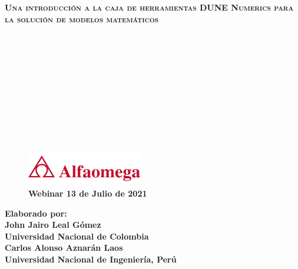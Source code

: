 {
\begin{frame}

	\color{c++reviewduneblue}

	\begin{flushleft}\bfseries\scshape\huge
		Una introducción a la caja de herramientas DUNE Numerics
		para la solución de modelos matemáticos
	\end{flushleft}

	\

	\

	\

	\

	\

	\

	\begin{minipage}{0.47\textwidth}
		\begin{figure}[ht!]
			\centering
			\includegraphics[height=1.5cm]{alfaomega}
			\caption*{
				\large
				\bfseries
				\textcolor{c++reviewduneblue}{Webinar 13 de Julio de 2021}
			}
		\end{figure}
	\end{minipage}
	\begin{minipage}{0.5\textwidth}
		\begin{flushright}
			\large
			\bfseries
			Elaborado por:\\
			John Jairo Leal Gómez\\
			Universidad Nacional de Colombia\\
			Carlos Alonso Aznarán Laos\\
			Universidad Nacional de Ingeniería, Perú
		\end{flushright}
	\end{minipage}
\end{frame}
}
